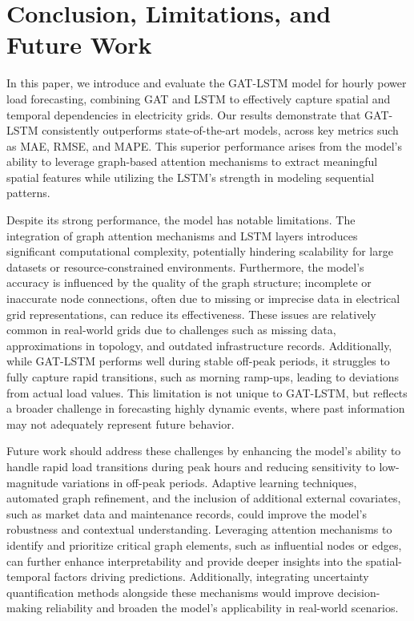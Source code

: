 \documentclass[sigconf,nonacm]{acmart}
\begin{document}
\section{Conclusion, Limitations, and Future Work}
\label{sec:conclusion}
In this paper, we introduce and evaluate the GAT-LSTM model for hourly power load forecasting, combining GAT and LSTM to effectively capture spatial and temporal dependencies in electricity grids. Our results demonstrate that GAT-LSTM consistently outperforms state-of-the-art models, across key metrics such as MAE, RMSE, and MAPE. This superior performance arises from the model's ability to leverage graph-based attention mechanisms to extract meaningful spatial features while utilizing the LSTM’s strength in modeling sequential patterns.
\par Despite its strong performance, the model has notable limitations. The integration of graph attention mechanisms and LSTM layers introduces significant computational complexity, potentially hindering scalability for large datasets or resource-constrained environments. Furthermore, the model's accuracy is influenced by the quality of the graph structure; incomplete or inaccurate node connections, often due to missing or imprecise data in electrical grid representations, can reduce its effectiveness. These issues are relatively common in real-world grids due to challenges such as missing data, approximations in topology, and outdated infrastructure records. Additionally, while GAT-LSTM performs well during stable off-peak periods, it struggles to fully capture rapid transitions, such as morning ramp-ups, leading to deviations from actual load values. This limitation is not unique to GAT-LSTM, but reflects a broader challenge in forecasting highly dynamic events, where past information may not adequately represent future behavior.
\par Future work should address these challenges by enhancing the model’s ability to handle rapid load transitions during peak hours and reducing sensitivity to low-magnitude variations in off-peak periods. Adaptive learning techniques, automated graph refinement, and the inclusion of additional external covariates, such as market data and maintenance records, could improve the model's robustness and contextual understanding. Leveraging attention mechanisms to identify and prioritize critical graph elements, such as influential nodes or edges, can further enhance interpretability and provide deeper insights into the spatial-temporal factors driving predictions. Additionally, integrating uncertainty quantification methods alongside these mechanisms would improve decision-making reliability and broaden the model's applicability in real-world scenarios.
\end{document}

